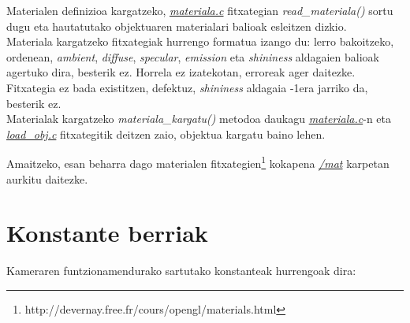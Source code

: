 \documentclass[12pt]{article}
\newcommand{\fitxategi}[1] {\underline{\textit{#1}}}
\newcommand{\metodo}[1] {\textit{#1}}
\newcommand{\aldagai}[1] {\textit{#1}}
\begin{document}
Materialen definizioa kargatzeko, \fitxategi{materiala.c} fitxategian \metodo{read\_materiala()} sortu dugu eta hautatutako objektuaren materialari balioak esleitzen dizkio.\\

Materiala kargatzeko fitxategiak hurrengo formatua izango du: lerro bakoitzeko, ordenean, \aldagai{ambient}, \aldagai{diffuse}, \aldagai{specular}, \aldagai{emission} eta \aldagai{shininess} aldagaien balioak agertuko dira, besterik ez. Horrela ez izatekotan, erroreak ager daitezke. Fitxategia ez bada existitzen, defektuz, \aldagai{shininess} aldagaia -1era jarriko da, besterik ez.\\

Materialak kargatzeko \metodo{materiala\_kargatu()} metodoa daukagu \fitxategi{materiala.c}-n eta \fitxategi{load\_obj.c} fitxategitik deitzen zaio, objektua kargatu baino lehen.

Amaitzeko, esan beharra dago materialen fitxategien\footnote{http://devernay.free.fr/cours/opengl/materials.html} kokapena \fitxategi{/mat} karpetan aurkitu daitezke.

\section{Konstante berriak}\label{constants}

Kameraren funtzionamendurako sartutako konstanteak hurrengoak dira:
\end{document}
